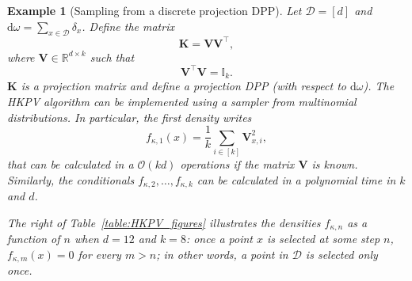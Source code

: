\documentclass[twoside,11pt]{book}
\newtheorem{example}{Example}
\numberwithin{theorem}{chapter}
\numberwithin{definition}{chapter}
\numberwithin{proposition}{chapter}
\numberwithin{corollary}{chapter}
\numberwithin{example}{chapter}
\numberwithin{lemma}{chapter}
\numberwithin{assumption}{chapter}
\DeclareMathOperator{\Tran}{\intercal}
\begin{document}
 \begin{example}[Sampling from a discrete projection DPP]
Let $\mathcal{D} = [d]$ and $\mathrm{d}\omega = \sum\limits_{x \in \mathcal{D}} \delta_{x}$. Define the matrix
\begin{equation}
\bm{K} = \bm{V}\bm{V}^{\Tran},
\end{equation} 
where $\bm{V}\in \mathbb{R}^{d \times k}$ such that
\begin{equation}
\bm{V}^{\Tran}\bm{V} = \mathbb{I}_{k}.
\end{equation}
$\bm{K}$ is a projection matrix and define a projection DPP (with respect to $\mathrm{d}\omega$). The HKPV algorithm can be implemented using a sampler from multinomial distributions. In particular, the first density writes
\begin{equation}
f_{\kappa,1}(x) = \frac{1}{k} \sum\limits_{i \in [k]} \bm{V}_{x,i}^{2},
\end{equation}
that can be calculated in a $\mathcal{O}(kd)$ operations if the matrix $\bm{V}$ is known. Similarly, the conditionals $f_{\kappa,2}, \dots, f_{\kappa,k}$ can be calculated in a polynomial time in $k$ and $d$. 

The right of Table~\ref{table:HKPV_figures} illustrates the  densities $f_{\kappa,n}$ as a function of $n$ when $d = 12$ and $k = 8$: once a point $x$ is selected at some step $n$, $f_{\kappa,m}(x) = 0$ for every $m>n$; in other words, a point in $\mathcal{D}$ is selected only once.
 \end{example}
\end{document}
